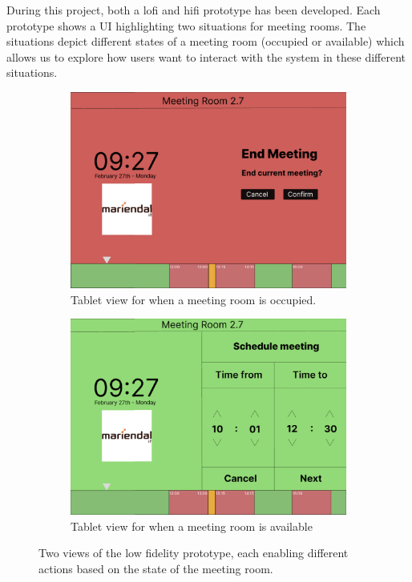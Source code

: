During this project, both a lofi and hifi prototype has been developed.
Each prototype shows a UI highlighting two situations for meeting rooms. 
The situations depict different states of a meeting room (occupied or available) which allows us to explore how users want to interact with the system in these different situations. 


\begin{figure}
    \centering
    \begin{subfigure}[b]{0.49\textwidth}
        \centering
        \includegraphics[width=\textwidth]{images/lofi_end.png}
        \caption{Tablet view for when a meeting room is occupied.}
        \label{fig:lofi_prototype:a}
    \end{subfigure}
    \begin{subfigure}[b]{0.49\textwidth}
        \centering
        \includegraphics[width=\textwidth]{images/lofi_schedule.png}
        \caption{Tablet view for when a meeting room is available}
        \label{fig:lofi_prototype:b}
    \end{subfigure}
    \caption{Two views of the low fidelity prototype, each enabling different actions based on the state of the meeting room.}
    \label{fig:lofi_prototype}
\end{figure}

